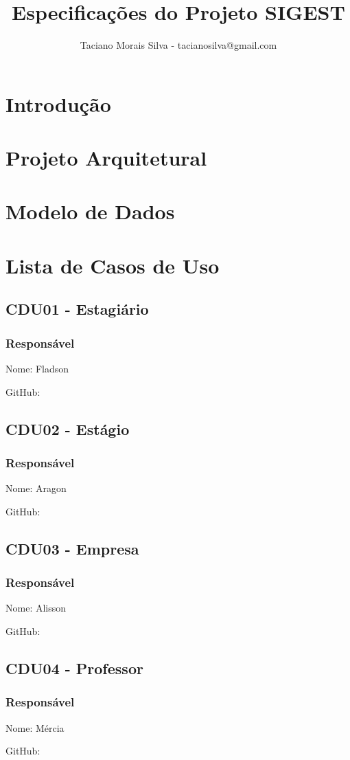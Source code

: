 \documentclass[12pt]{report}
\title{Especificações do Projeto SIGEST}
\author{Taciano Morais Silva - tacianosilva@gmail.com}
\begin{document}
\maketitle
\tableofcontents

\chapter{Introdução}

\chapter{Projeto Arquitetural}

\chapter{Modelo de Dados}

\chapter{Lista de Casos de Uso}

\section{CDU01 - Estagiário}

\subsection{Responsável}

Nome: Fladson

GitHub:



\section{CDU02 - Estágio}

\subsection{Responsável}

Nome: Aragon

GitHub:



\section{CDU03 - Empresa}

\subsection{Responsável}

Nome: Alisson

GitHub:



\section{CDU04 - Professor}

\subsection{Responsável}

Nome: Mércia

GitHub:


\end{document}
